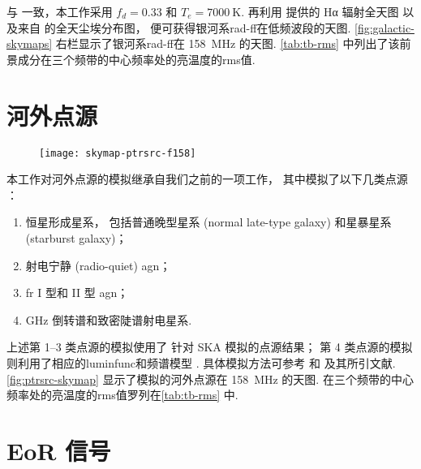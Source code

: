 与  一致，本工作采用 $f_d = 0.33$
和 $T_e = \SI{7000}{\kelvin}$.
再利用  提供的 Hα 辐射全天图
以及来自  的全天尘埃分布图，
便可获得银河系\ac{rad-ff}在低频波段的天图.
\autoref{fig:galactic-skymaps} 右栏显示了银河系\ac{rad-ff}在 \SI{158}{\MHz} 的天图.
\autoref{tab:tb-rms} 中列出了该前景成分在三个频带的中心频率处的亮温度的\ac{rms}值.


\section{河外点源}

\begin{figure}[htp]
  \centering
  \texttt{[image: skymap-ptrsrc-f158]}
  \label{fig:ptrsrc-skymap}
\end{figure}

本工作对河外点源的模拟继承自我们之前的一项工作\cite{wang2010}，
其中模拟了以下几类点源 \cite{snellen2000,wilman2008,wang2010}：
\begin{enumerate}
  \item 恒星形成星系，
    包括普通晚型星系 (normal late-type galaxy) 和星暴星系 (starburst galaxy)；
  \item 射电宁静 (radio-quiet) \ac{agn}；
  \item \ac{fr} I 型和 II 型 \ac{agn}；
  \item GHz 倒转谱和致密陡谱射电星系.
\end{enumerate}
上述第 1--3 类点源的模拟使用了  针对 SKA 模拟的点源结果；
第 4 类点源的模拟则利用了相应的\ac{luminfunc}和频谱模型
\cite{oDea1998,snellen1998,fanti2001}.
具体模拟方法可参考  和  及其所引文献.
\autoref{fig:ptrsrc-skymap} 显示了模拟的河外点源在 \SI{158}{\MHz} 的天图.
在三个频带的中心频率处的亮温度的\ac{rms}值罗列在\autoref{tab:tb-rms} 中.


\section{EoR 信号}

